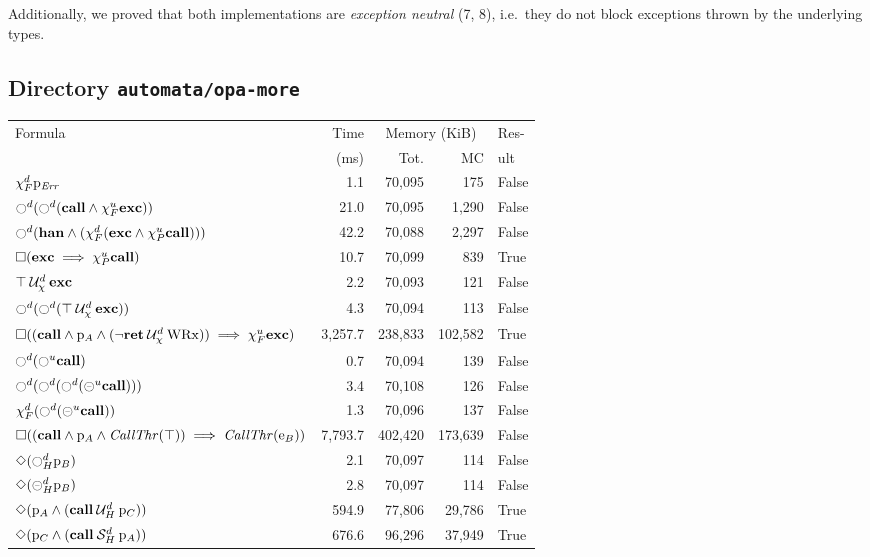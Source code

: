 \documentclass[9pt,a4paper]{article}
\begin{document}
Additionally, we proved that both implementations are
\emph{exception neutral} (7, 8), i.e.\ they do not block exceptions
thrown by the underlying types.


\subsection{Directory \texttt{automata/opa-more}}

\begin{table}[tb]
\centering
\fontsize{9pt}{10pt}\selectfont
\begin{tabular}{| l | r | r | r | l |}
\hline
Formula	& Time & \multicolumn{2}{c|}{Memory (KiB)} & Res- \\
\cline{3-4}
& (ms) & Tot. & MC & ult \\
\hline
$\chi_F^{d} \mathrm{p}_\mathit{Err}$ 	&	1.1	&	70,095	&	175	&	False	\\
$\ocircle^d (\ocircle^d (\mathbf{call} \land \chi_F^{u} \mathbf{exc}))$ 	&	21.0	&	70,095	&	1,290	&	False	\\
$\ocircle^d (\mathbf{han} \land (\chi_F^{d} (\mathbf{exc} \land \chi_P^{u} \mathbf{call})))$ 	&	42.2	&	70,088	&	2,297	&	False	\\
$\square (\mathbf{exc} \implies \chi_P^{u} \mathbf{call})$ 	&	10.7	&	70,099	&	839	&	True	\\
${\top} \mathbin{\mathcal{U}_\chi^d} {\mathbf{exc}}$ 	&	2.2	&	70,093	&	121	&	False	\\
$\ocircle^d (\ocircle^d ({\top} \mathbin{\mathcal{U}_\chi^d} {\mathbf{exc}}))$ 	&	4.3	&	70,094	&	113	&	False	\\
$\square ((\mathbf{call} \land \mathrm{p}_A \land ({\neg \mathbf{ret}} \mathbin{\mathcal{U}_\chi^d} {\mathrm{WRx}})) \implies \chi_F^{u} \mathbf{exc})$ 	&	3,257.7	&	238,833	&	102,582	&	True	\\
$\ocircle^d (\ocircle^u \mathbf{call})$ 	&	0.7	&	70,094	&	139	&	False	\\
$\ocircle^d (\ocircle^d (\ocircle^d (\circleddash^u \mathbf{call})))$ 	&	3.4	&	70,108	&	126	&	False	\\
$\chi_F^{d} (\ocircle^d (\circleddash^u \mathbf{call}))$ 	&	1.3	&	70,096	&	137	&	False	\\
$\square ((\mathbf{call} \land \mathrm{p}_A \land \mathit{CallThr}(\top)) \implies \mathit{CallThr}(\mathrm{e}_B))$ 	&	7,793.7	&	402,420	&	173,639	&	False	\\
$\Diamond (\ocircle_H^{d} \mathrm{p}_B)$ 	&	2.1	&	70,097	&	114	&	False	\\
$\Diamond (\circleddash_H^{d} \mathrm{p}_B)$ 	&	2.8	&	70,097	&	114	&	False	\\
$\Diamond (\mathrm{p}_A \land ({\mathbf{call}} \mathbin{\mathcal{U}_H^d} {\mathrm{p}_C}))$ 	&	594.9	&	77,806	&	29,786	&	True	\\
$\Diamond (\mathrm{p}_C \land ({\mathbf{call}} \mathbin{\mathcal{S}_H^d} {\mathrm{p}_A}))$ 	&	676.6	&	96,296	&	37,949	&	True	\\

\end{tabular}
\end{table}
\end{document}
